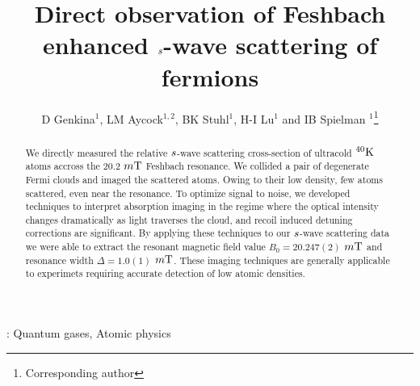 \documentclass[12pt]{iopart}
\begin{document}
\newcommand{\swave}[0]{$\it{s}$-wave }
\newcommand{\pwave}[0]{$\it{p}$-wave }
\newcommand{\K}{ $^{40}\rm{K}$}
\newcommand{\Rb}{ $^{87}\rm{Rb}$}
\newcommand{\us}{$\mu \rm{s}$} 
\newcommand{\mT}{$m\rm{T}$}
\newcommand{\ez}{$\hat{e}_z$}
\newcommand{\um}{$\mu \rm{m}$} 

\title[]{Direct observation of Feshbach enhanced \swave scattering of fermions}

\author{D Genkina$^1$, LM Aycock$^{1,2}$, BK Stuhl$^1$, H-I Lu$^1$ and IB Spielman
$^1$\footnote{Corresponding author}}

\address{$^1$Joint Quantum Institute, National Institute of Standards and Technology, and University of Maryland, Gaithersburg, MD, 20899 USA}
\address{$^2$Physics Department, Cornell University, Ithaca, NY 14850 USA}


\begin{abstract}
We directly measured the relative \swave{} scattering cross-section of ultracold \K{} atoms accross the 20.2 \mT{} Feshbach resonance. We collided a pair of degenerate Fermi clouds and imaged the scattered atoms. Owing to their low density, few atoms scattered, even near the resonance. To optimize signal to noise, we developed techniques to interpret absorption imaging in the regime where the optical intensity changes dramatically as light traverses the cloud, and recoil induced 
detuning corrections are significant. By applying these techniques to our \swave{} scattering data we were able to extract the resonant magnetic
field value  $B_0 = 20.247(2)$  \mT{} and resonance width $\Delta = 1.0(1)$  \mT{}. These imaging techniques are generally applicable to experimets requiring accurate detection of low atomic densities. 

\end{abstract}

\vspace{2pc}
: Quantum gases, Atomic physics

\maketitle
\end{document}
